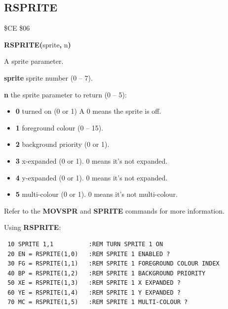 \subsection{RSPRITE}
\begin{description}[leftmargin=2cm,style=nextline]
\item [Token:] \$CE \$06
\item [Format:] {\bf RSPRITE(}sprite{\bf,} n{\bf)}
\item [Returns:]  A sprite parameter.

                {\bf sprite} sprite number (0 -- 7).

                {\bf n} the sprite parameter to return (0 -- 5):

                \begin{itemize}
                    \item {\bf 0} turned on (0 or 1) A 0 means the sprite is off.
                    \item {\bf 1} foreground colour (0 -- 15).
                    \item {\bf 2} background priority (0 or 1).
                    \item {\bf 3} x-expanded (0 or 1). 0 means it's not expanded.
                    \item {\bf 4} y-expanded (0 or 1). 0 means it's not expanded.
                    \item {\bf 5} multi-colour (0 or 1).  0 means it's not multi-colour.
                \end{itemize}

\item [Remarks:] Refer to the {\bf MOVSPR} and {\bf SPRITE} commands for more information.

\item [Example:] Using {\bf RSPRITE}:
\begin{tcolorbox}[colback=black,coltext=white]
\verbatimfont{\codefont}
\begin{verbatim}
 10 SPRITE 1,1          :REM TURN SPRITE 1 ON
 20 EN = RSPRITE(1,0)   :REM SPRITE 1 ENABLED ?
 30 FG = RSPRITE(1,1)   :REM SPRITE 1 FOREGROUND COLOUR INDEX
 40 BP = RSPRITE(1,2)   :REM SPRITE 1 BACKGROUND PRIORITY
 50 XE = RSPRITE(1,3)   :REM SPRITE 1 X EXPANDED ?
 60 YE = RSPRITE(1,4)   :REM SPRITE 1 Y EXPANDED ?
 70 MC = RSPRITE(1,5)   :REM SPRITE 1 MULTI-COLOUR ?
\end{verbatim}
\end{tcolorbox}
\end{description}

